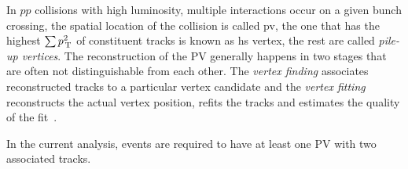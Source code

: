 In $pp$ collisions with high luminosity, multiple interactions occur on a given
bunch crossing, the spatial location of the collision is called \gls{pv}, the
one that has the highest $\sum p_\mathrm{\, T}^2$ of constituent tracks is known as \gls{hs}
vertex, the rest are called \emph{pile-up vertices}. The reconstruction of the
PV generally happens in two stages that are often not distinguishable from each
other. The \emph{vertex finding} associates reconstructed tracks to a particular
vertex candidate and the \emph{vertex fitting} reconstructs the actual vertex
position, refits the tracks and estimates the quality of the fit~\cite{PV}.

In the current analysis, events are required to have at least one PV with two
associated tracks.
